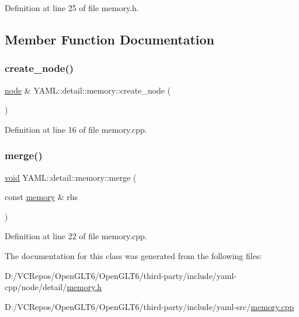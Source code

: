 Definition at line 25 of file memory.\+h.



\subsection{Member Function Documentation}
\mbox{\label{class_y_a_m_l_1_1detail_1_1memory_a0b8bc8ca722445823cd844e4dec22747}} 
\subsubsection{\texorpdfstring{create\_node()}{create\_node()}}
{\footnotesize\ttfamily \mbox{\hyperlink{class_y_a_m_l_1_1detail_1_1node}{node}} \& Y\+A\+M\+L\+::detail\+::memory\+::create\+\_\+node (\begin{DoxyParamCaption}{ }\end{DoxyParamCaption})}



Definition at line 16 of file memory.\+cpp.

\mbox{\label{class_y_a_m_l_1_1detail_1_1memory_a612781f2174ffe5d88637ae9235dd162}} 
\subsubsection{\texorpdfstring{merge()}{merge()}}
{\footnotesize\ttfamily \mbox{\hyperlink{glad_8h_a950fc91edb4504f62f1c577bf4727c29}{void}} Y\+A\+M\+L\+::detail\+::memory\+::merge (\begin{DoxyParamCaption}\item[{const \mbox{\hyperlink{class_y_a_m_l_1_1detail_1_1memory}{memory}} \&}]{rhs }\end{DoxyParamCaption})}



Definition at line 22 of file memory.\+cpp.



The documentation for this class was generated from the following files\+:\begin{DoxyCompactItemize}
\item 
D\+:/\+V\+C\+Repos/\+Open\+G\+L\+T6/\+Open\+G\+L\+T6/third-\/party/include/yaml-\/cpp/node/detail/\mbox{\hyperlink{memory_8h}{memory.\+h}}\item 
D\+:/\+V\+C\+Repos/\+Open\+G\+L\+T6/\+Open\+G\+L\+T6/third-\/party/include/yaml-\/src/\mbox{\hyperlink{memory_8cpp}{memory.\+cpp}}\end{DoxyCompactItemize}
